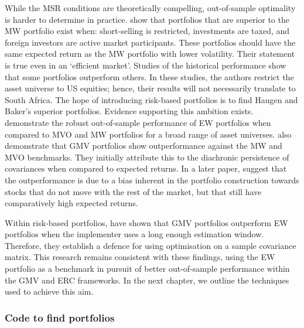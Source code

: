 \documentclass[
]{article}
\begin{document}
While the MSR conditions are theoretically compelling, out-of-sample optimality is harder to determine
in practice. \citet{H91} show that portfolios that are superior to the MW portfolio exist when:
short-selling is restricted, investments are taxed, and foreign investors are active market
participants. These portfolios should have the same expected return as the MW portfolio with lower
volatility. Their statement is true even in an `efficient market'. Studies of the historical
performance show that some portfolios outperform others. In these studies, the authors restrict the
asset universe to US equities; hence, their results will not necessarily translate to South Africa.
The hope of introducing risk-based portfolios is to find Haugen and Baker's superior portfolios.
Evidence supporting this ambition exists. \citet{DGL07} demonstrate the robust out-of-sample
performance of EW portfolios when compared to MVO and MW portfolios for a broad range of asset
universes. \citet{C06} also demonstrate that GMV portfolios show outperformance against the MW and MVO
benchmarks. They initially attribute this to the diachronic persistence of covariances when compared
to expected returns. In a later paper, \citet{C11} suggest that the outperformance is due to a bias
inherent in the portfolio construction towards stocks that do not move with the rest of the market,
but that still have comparatively high expected returns.

Within risk-based portfolios, \citet{K10} have shown that GMV portfolios outperform EW portfolios when the
implementer uses a long enough estimation window. Therefore, they establish a defence for using
optimisation on a sample covariance matrix. This research remains consistent with these findings,
using the EW portfolio as a benchmark in pursuit of better out-of-sample performance within the GMV
and ERC frameworks. In the next chapter, we outline the techniques used to achieve this aim.

\hypertarget{code-to-find-portfolios}{%
\subsubsection{Code to find portfolios}\label{code-to-find-portfolios}}
\end{document}
